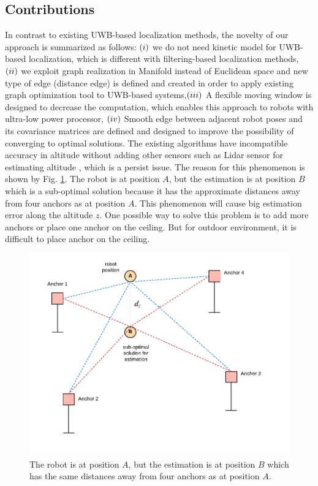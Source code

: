 \documentclass[journal]{IEEEtran}
\begin{document}
\subsection{Contributions}
In contrast to existing UWB-based localization methods, the novelty of our approach is summarized as follows: $(\romannumeral1)$ we do not need kinetic model for UWB-based localization, which is different with filtering-based localization methods, $(\romannumeral2)$ we exploit graph realization in Manifold instead of Euclidean space and new type of edge (distance edge) is defined and created in order to apply existing graph optimization tool to UWB-based systems,$(\romannumeral3)$ A flexible moving window is designed to decrease the computation, which enables this approach to robots with ultra-low power processor, $(\romannumeral4)$ Smooth edge between adjacent robot poses and its covariance matrices are defined and designed to improve the possibility of converging to optimal solutions.
 The existing algorithms have incompatible accuracy in altitude without adding other sensors such as Lidar sensor for estimating altitude , which is a persist issue. The reason for this phenomenon is shown by Fig. \ref{fig1}. The robot is at position $A$, but the estimation is at position $B$ which is a sub-optimal solution because it has the approximate distances away from four anchors as at position $A$. This phenomenon will cause big estimation error along the altitude $z$. One possible way to solve this problem is to add more anchors or place one anchor on the ceiling. But for outdoor environment, it is difficult to place anchor on the ceiling. 

\begin{figure}[!t]
 \centering
\includegraphics[width=0.9\linewidth]{pic/sub-optimal.pdf}
\caption{The robot is at position $A$, but the estimation is at position $B$ which has the same distances away from four anchors as at position $A$.}
\label{fig1}
\end{figure}
\end{document}
